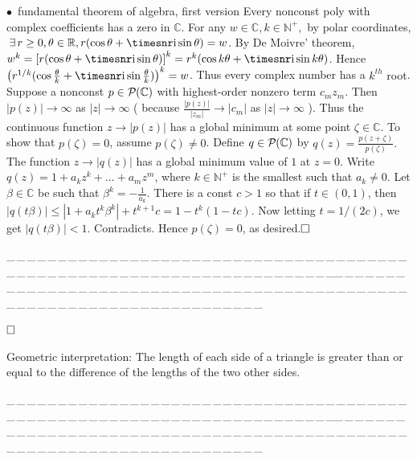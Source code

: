 \documentclass[a4paper, 11pt, UTF8]{article}
\def\i{{\timesnr\textup{i}}}
\def\Rbb{{\mathbb{R}}}
\def\Cbb{{\mathbb{C}}}
\def\Nbp{{\mathbb{N}^+}}
\def\BulletPoint{{\small$\bullet$}}
\def\ProblemEnding{{\tiny \_\,\_\,\_\,\_\,\_\,\_\,\_\,\_\,\_\,\_\,\_\,\_\,\_\,\_\,\_\,\_\,\_\,\_\,\_\,\_\,\_\,\_\,\_\,\_\,\_\,\_\,\_\,\_\,\_\,\_\,\_\,\_\,\_\,\_\,\_\,\_\,\_\,\_\,\_\,\_\,\_\,\_\,\_\,\_\,\_\,\_\,\_\,\_\,\_\,\_\,\_\,\_\,\_\,\_\,\_\,\_\,\_\,\_\,\_\,\_\,\_\,\_\,\_\,\_\,\_\,\_\,\_\,\_\,\_\,\_\,\_\_\,\_\,\_\,\_\,\_\,\_\,\_\,\_\,\_\,\_\,\_\,\_\,\_\,\_\,\_\,\_\,\_\,\_\,\_\,\_\,\_\,\_\,\_\,\_\,\_\,\_\,\_\,\_\,\_\,\_\,\_\,\_\,\_\,\_\,\_\,\_\,\_\,\_\,\_\,\_\,\_\,\_\,\_\,\_\,\_\,\_\,\_\,\_\,\_\,\_\,\_\,\_\,\_\,\_\,\_\,\_\,\_\,\_\,\_\,\_\,\_\,\_\,\_\,\_\,\_\,\_\,\_\,\_\,\_\,\_\,\_}}
\begin{document}
\begin{large}
\BulletPoint \,\hspace{1pt}\NoteFor{[4.13]} {\timessl fundamental theorem of algebra, first version}\TextB{}
{\timessl Every nonconst poly with complex coefficients has a zero in $\Cbb$.} 
For any $w\in\Cbb,k\in\Nbp,$ by polar coordinates, $\,\exists\,r\geq 0,\theta\in\Rbb,r(\cos\theta + \i \sin\theta) = w$.\TextB{}
By De Moivre' theorem, $w^k=\left[r(\cos\theta +\i\sin \theta)\right]^k=r^k(\cos k\theta + \i \sin k\theta)$.\TextB{}
Hence $\left(r^{1/k}(\cos\frac{\theta}{k} +\i\sin\frac{\theta}{k})\right)^k=w$. Thus every complex number has a {\timessl $k^{th}$ root}.\vspace{5pt}\TextB{}
Suppose a nonconst $p\in\PoC{}$ with highest-order nonzero term $c_m z_m$.\TextB{}
Then $\left|p(z)\right|\rightarrow\infty$ as $\left|z\right|\rightarrow\infty$ ( because $\displaystyle\frac{\left|p(z)\right|}{\left|z_m\right|}\rightarrow\left|c_m\right|$ as $\left|z\right|\rightarrow\infty$ ).\TextB{}
\vspace{3pt}Thus the continuous function $z\rightarrow\left|p(z)\right|$ has a global minimum at some point $\zeta\in\Cbb.$\TextB{}
\vspace{3pt}To show that $p(\zeta) = 0$, assume $p(\zeta)\neq 0$. Define $q\in\PoC{}$ by $q(z)=\displaystyle\frac{p(z+\zeta)}{p(\zeta)}.$\TextB{}
The function $z\rightarrow\left|q(z)\right|$ has a global minimum value of $1$ at $z = 0$.\TextB{}
Write $q(z) = 1 + a_k z^k + \dots + a_m z^m$, where $k\in\Nbp$ is the smallest such that $a_k\neq 0$.\TextB{}
Let $\beta\in\Cbb$ be such that $\displaystyle\beta^k=-\frac{1}{a_k}$.\TextB{}
There is a const $c > 1$ so that if
$t\in (0, 1)$, then $\left|q(t\beta)\right|\leq\left|1 + a_k t^k\beta^k\right|+t^{k+1}c = 1 - t^k (1 - tc)$.\TextB{}
Now letting $t=1/(2c)$, we get $\left|q(t\beta)\right| < 1$. Contradicts. Hence $p(\zeta) = 0$, as desired.$\hfill\square$\par
\ProblemEnding\par

\ProblemB{
	\TextB{Prove that if $w,z\in\Cbb,$ then $\left||w|-|z|\right|\leq\left|w-z\right|$.}
}\vspace{-8pt}$\hfill\square$\par
{\timessl\footnotesize Geometric interpretation: The length of each side of a triangle is greater than or equal to the difference of the lengths of the two other sides.}\par
\ProblemEnding\par


\end{large}
\end{document}
